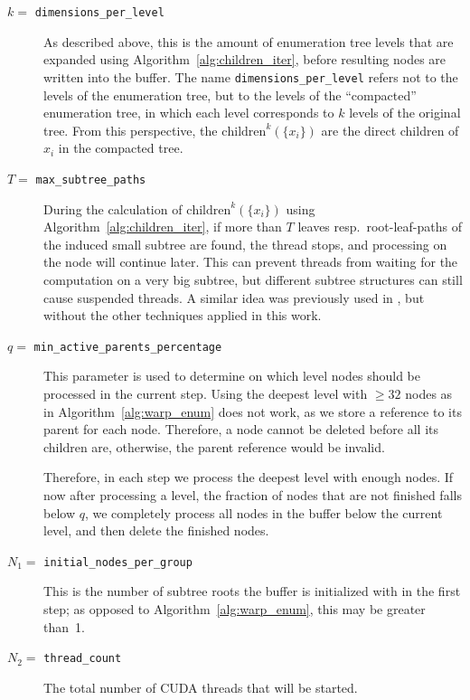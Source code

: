 \documentclass{scrartcl}
\begin{document}
    \begin{description}
        \item[$k =$ \texttt{dimensions\_per\_level}]
            As described above, this is the amount of enumeration tree levels that are expanded using Algorithm~\ref{alg:children_iter}, before resulting nodes are written into the buffer. The name \texttt{dimensions\_per\_level} refers not to the levels of the enumeration tree, but to the levels of the ``compacted'' enumeration tree, in which each level corresponds to $k$ levels of the original tree. From this perspective, the $\mathrm{children}^k(\{x_i\})$ are the direct children of $x_i$ in the compacted tree.
        \item[$T =$ \texttt{max\_subtree\_paths}] 
            During the calculation of $\mathrm{children}^k(\{x_i\})$ using Algorithm~\ref{alg:children_iter}, if more than $T$ leaves resp.\ root-leaf-paths of the induced small subtree are found, the thread stops, and processing on the node will continue later. This can prevent threads from waiting for the computation on a very big subtree, but different subtree structures can still cause suspended threads. 
            A similar idea was previously used in \cite{prev_gpu_enum}, but without the other techniques applied in this work.
        \item[$q =$ \texttt{min\_active\_parents\_percentage}]
            This parameter is used to determine on which level nodes should be processed in the current step. Using the deepest level with $\geq 32$ nodes as in Algorithm~\ref{alg:warp_enum} does not work, as we store a reference to its parent for each node. Therefore, a node cannot be deleted before all its children are, otherwise, the parent reference would be invalid. 
            
            Therefore, in each step we process the deepest level with enough nodes.
            If now after processing a level, the fraction of nodes that are not finished falls below $q$, we completely process all nodes in the buffer below the current level, and then delete the finished nodes.
        \item[$N_1 =$ \texttt{initial\_nodes\_per\_group}]
            This is the number of subtree roots the buffer is initialized with in the first step; as opposed to Algorithm~\ref{alg:warp_enum}, this may be greater than~1.
        \item[$N_2 =$ \texttt{thread\_count}]
            The total number of CUDA threads that will be started. 
    \end{description}
\end{document}
